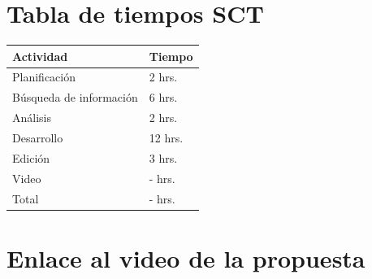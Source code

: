 \documentclass[conference,compsoc]{IEEEtran}
\begin{document}
\section{Tabla de tiempos SCT}

\begin{table}[h]
    \begin{tabular}{|l|l|}
        \hline
        Actividad                   & Tiempo    \\ \hline
        Planificación               & 2  hrs.    \\ \hline
        Búsqueda de información     & 6  hrs.    \\ \hline
        Análisis                    & 2  hrs.    \\ \hline
        Desarrollo                  & 12 hrs.    \\ \hline
        Edición                     & 3  hrs.    \\ \hline
        Video                       & -  hrs.    \\ \hline
        Total                       & -  hrs.    \\ \hline
    \end{tabular}
\end{table}

\section{Enlace al video de la propuesta}
\end{document}

